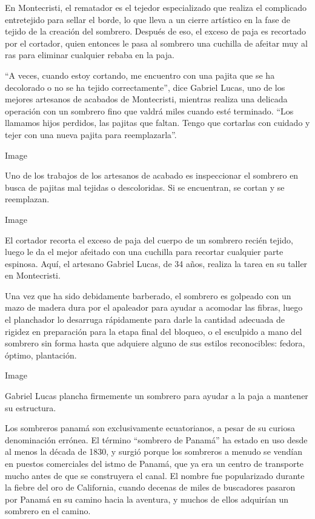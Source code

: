 En Montecristi, el rematador es el tejedor especializado que realiza el
complicado entretejido para sellar el borde, lo que lleva a un cierre
artístico en la fase de tejido de la creación del sombrero. Después de
eso, el exceso de paja es recortado por el cortador, quien entonces le
pasa al sombrero una cuchilla de afeitar muy al ras para eliminar
cualquier rebaba en la paja.

``A veces, cuando estoy cortando, me encuentro con una pajita que se ha
decolorado o no se ha tejido correctamente'', dice Gabriel Lucas, uno de
los mejores artesanos de acabados de Montecristi, mientras realiza una
delicada operación con un sombrero fino que valdrá miles cuando esté
terminado. ``Los llamamos hijos perdidos, las pajitas que faltan. Tengo
que cortarlas con cuidado y tejer con una nueva pajita para
reemplazarla''.

Image

Uno de los trabajos de los artesanos de acabado es inspeccionar el
sombrero en busca de pajitas mal tejidas o descoloridas. Si se
encuentran, se cortan y se reemplazan.

Image

El cortador recorta el exceso de paja del cuerpo de un sombrero recién
tejido, luego le da el mejor afeitado con una cuchilla para recortar
cualquier parte espinosa. Aquí, el artesano Gabriel Lucas, de 34 años,
realiza la tarea en su taller en Montecristi.

Una vez que ha sido debidamente barberado, el sombrero es golpeado con
un mazo de madera dura por el apaleador para ayudar a acomodar las
fibras, luego el planchador lo desarruga rápidamente para darle la
cantidad adecuada de rigidez en preparación para la etapa final del
bloqueo, o el esculpido a mano del sombrero sin forma hasta que adquiere
alguno de sus estilos reconocibles: fedora, óptimo, plantación.

Image

Gabriel Lucas plancha firmemente un sombrero para ayudar a la paja a
mantener su estructura.

Los sombreros panamá son exclusivamente ecuatorianos, a pesar de su
curiosa denominación errónea. El término ``sombrero de Panamá'' ha
estado en uso desde al menos la década de 1830, y surgió porque los
sombreros a menudo se vendían en puestos comerciales del istmo de
Panamá, que ya era un centro de transporte mucho antes de que se
construyera el canal. El nombre fue popularizado durante la fiebre del
oro de California, cuando decenas de miles de buscadores pasaron por
Panamá en su camino hacia la aventura, y muchos de ellos adquirían un
sombrero en el camino.

